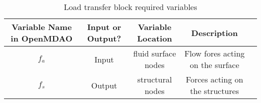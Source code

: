 \documentclass{article}
\begin{document}
\begin{table}[H]
  \centering
  \caption{Load transfer block required variables}
  \label{tab:load_xfer_vars}
  \begin{tabular}{c|c|c|c|c}
    Variable Name in OpenMDAO & Input or Output? & Variable Location   & Description \\
    \midrule
    $f_a$                     & Input            & fluid surface nodes & Flow fores acting on the surface \\
    $f_s$                     & Output           & structural nodes    & Forces acting on the structures \\
  \end{tabular}
\end{table}
\end{document}
